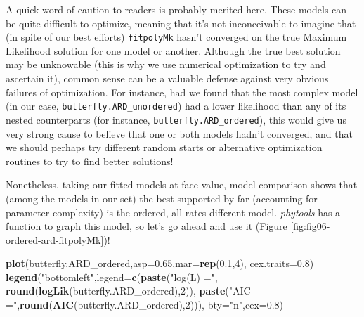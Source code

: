 \documentclass[fleqn,10pt,lineno]{wlpeerj} %
\newenvironment{Shaded}{\begin{snugshade}}{\end{snugshade}}
\newcommand{\AttributeTok}[1]{\textcolor[rgb]{0.13,0.29,0.53}{#1}}
\newcommand{\DecValTok}[1]{\textcolor[rgb]{0.00,0.00,0.81}{#1}}
\newcommand{\FloatTok}[1]{\textcolor[rgb]{0.00,0.00,0.81}{#1}}
\newcommand{\FunctionTok}[1]{\textcolor[rgb]{0.13,0.29,0.53}{\textbf{#1}}}
\newcommand{\NormalTok}[1]{#1}
\newcommand{\StringTok}[1]{\textcolor[rgb]{0.31,0.60,0.02}{#1}}
\begin{document}
A quick word of caution to readers is probably merited here. These models can be quite difficult to optimize, meaning that it's not inconceivable to imagine that (in spite of our best efforts) \texttt{fitpolyMk} hasn't converged on the true Maximum Likelihood solution for one model or another. Although the true best solution may be unknowable (this is why we use numerical optimization to try and ascertain it), common sense can be a valuable defense against very obvious failures of optimization. For instance, had we found that the most complex model (in our case, \texttt{butterfly.ARD\_unordered}) had a lower likelihood than any of its nested counterparts (for instance, \texttt{butterfly.ARD\_ordered}), this would give us very strong cause to believe that one or both models hadn't converged, and that we should perhaps try different random starts or alternative optimization routines to try to find better solutions!

Nonetheless, taking our fitted models at face value, model comparison shows that (among the models in our set) the best supported by far (accounting for parameter complexity) is the ordered, all-rates-different model. \emph{phytools} has a function to graph this model, so let's go ahead and use it (Figure \ref{fig:fig06-ordered-ard-fitpolyMk})!

\begin{Shaded}
\begin{Highlighting}[]
\FunctionTok{plot}\NormalTok{(butterfly.ARD\_ordered,}\AttributeTok{asp=}\FloatTok{0.65}\NormalTok{,}\AttributeTok{mar=}\FunctionTok{rep}\NormalTok{(}\FloatTok{0.1}\NormalTok{,}\DecValTok{4}\NormalTok{),}
  \AttributeTok{cex.traits=}\FloatTok{0.8}\NormalTok{)}
\FunctionTok{legend}\NormalTok{(}\StringTok{"bottomleft"}\NormalTok{,}\AttributeTok{legend=}\FunctionTok{c}\NormalTok{(}\FunctionTok{paste}\NormalTok{(}\StringTok{"log(L) ="}\NormalTok{,}
  \FunctionTok{round}\NormalTok{(}\FunctionTok{logLik}\NormalTok{(butterfly.ARD\_ordered),}\DecValTok{2}\NormalTok{)),}
  \FunctionTok{paste}\NormalTok{(}\StringTok{"AIC ="}\NormalTok{,}\FunctionTok{round}\NormalTok{(}\FunctionTok{AIC}\NormalTok{(butterfly.ARD\_ordered),}\DecValTok{2}\NormalTok{))),}
  \AttributeTok{bty=}\StringTok{"n"}\NormalTok{,}\AttributeTok{cex=}\FloatTok{0.8}\NormalTok{)}
\end{Highlighting}
\end{Shaded}
\end{document}
